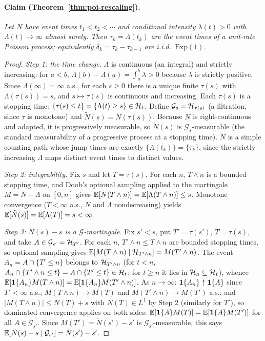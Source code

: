 \paragraph{Claim (Theorem~\ref{thm:poi-rescaling}).}
\emph{Let $N$ have event times $t_1 < t_2 < \cdots$ and conditional intensity $\lambda(t) > 0$ with
$\Lambda(t) \to \infty$ almost surely. Then $\tau_k = \Lambda(t_k)$ are the event times of a
unit-rate Poisson process; equivalently $\delta_k = \tau_k - \tau_{k-1}$ are i.i.d.\
$\mathrm{Exp}(1)$.}

\begin{proof}
\emph{Step 1: the time change.} $\Lambda$ is continuous (an integral) and strictly increasing: for
$a<b$, $\Lambda(b)-\Lambda(a) = \int_a^b \lambda > 0$ because $\lambda$ is strictly positive. Since
$\Lambda(\infty) = \infty$ a.s., for each $s \ge 0$ there is a unique finite $\tau(s)$ with
$\Lambda(\tau(s)) = s$, and $s \mapsto \tau(s)$ is continuous and increasing. Each $\tau(s)$ is a
stopping time: $\{\tau(s) \le t\} = \{\Lambda(t) \ge s\} \in \mathcal{H}_t$. Define $\mathcal{G}_s =
\mathcal{H}_{\tau(s)}$ (a filtration, since $\tau$ is monotone) and $\tilde N(s) = N(\tau(s))$. Because
$N$ is right-continuous and adapted, it is progressively measurable, so $\tilde N(s)$ is
$\mathcal{G}_s$-measurable (the standard measurability of a progressive process at a stopping time).
$\tilde N$ is a simple counting path whose jump times are exactly $\{\Lambda(t_k)\} = \{\tau_k\}$,
since the strictly increasing $\Lambda$ maps distinct event times to distinct values.

\emph{Step 2: integrability.} Fix $s$ and let $T = \tau(s)$. For each $n$, $T \wedge n$ is a bounded
stopping time, and Doob's optional sampling applied to the martingale $M = N - \Lambda$ on $[0,n]$
gives $\mathbb{E}[N(T \wedge n)] = \mathbb{E}[\Lambda(T \wedge n)] \le s$. Monotone convergence ($T < \infty$ a.s.,
$N$ and $\Lambda$ nondecreasing) yields $\mathbb{E}[\tilde N(s)] = \mathbb{E}[\Lambda(T)] = s < \infty$.

\emph{Step 3: $\tilde N(s) - s$ is a $\mathcal{G}$-martingale.} Fix $s' < s$, put $T' = \tau(s')$,
$T = \tau(s)$, and take $A \in \mathcal{G}_{s'} = \mathcal{H}_{T'}$. For each $n$, $T' \wedge n \le T
\wedge n$ are bounded stopping times, so optional sampling gives $\mathbb{E}[M(T \wedge n) \mid \mathcal{H}_{T'
\wedge n}] = M(T' \wedge n)$. The event $A_n = A \cap \{T' \le n\}$ belongs to $\mathcal{H}_{T' \wedge n}$
(for $t < n$, $A_n \cap \{T' \wedge n \le t\} = A \cap \{T' \le t\} \in \mathcal{H}_t$; for $t \ge n$ it
lies in $\mathcal{H}_n \subseteq \mathcal{H}_t$), whence $\mathbb{E}[\mathbf{1}\{A_n\} M(T \wedge n)] = \mathbb{E}[\mathbf{1}\{A_n\} M(T' \wedge
n)]$. As $n \to \infty$: $\mathbf{1}\{A_n\} \uparrow \mathbf{1}\{A\}$ since $T' < \infty$ a.s.; $M(T \wedge n) \to
M(T)$ and $M(T' \wedge n) \to M(T')$ a.s.; and $|M(T \wedge n)| \le N(T) + s$ with $N(T) \in L^1$ by
Step 2 (similarly for $T'$), so dominated convergence applies on both sides: $\mathbb{E}[\mathbf{1}\{A\} M(T)] =
\mathbb{E}[\mathbf{1}\{A\} M(T')]$ for all $A \in \mathcal{G}_{s'}$. Since $M(T') = \tilde N(s') - s'$ is
$\mathcal{G}_{s'}$-measurable, this says $\mathbb{E}[\tilde N(s) - s \mid \mathcal{G}_{s'}] = \tilde N(s') -
s'$.


\end{proof}
